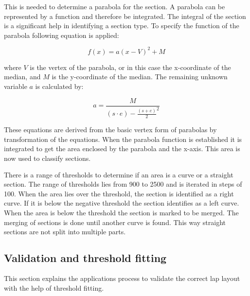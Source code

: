 This is needed to determine a parabola for the section. A parabola can be represented by a function and therefore be integrated. The integral of the section is a significant help in identifying a section type. To specify the function of the parabola following equation is applied:

\begin{equation}
	f(x) = a (x-V)^2 + M
\end{equation}

where $V$ is the vertex of the parabola, or in this case the x-coordinate of the median, and $M$ is the y-coordinate of the median. The remaining unknown variable $a$ is calculated by:

\begin{equation}
a = \frac{M}{(s\cdot e) - \frac{(s+e)}{2}^2 }
\end{equation}

These equations are derived from the basic vertex form of parabolas by transformation of the equations. When the parabola function is established it is integrated to get the area enclosed by the parabola and the x-axis. This area is now used to classify sections. 

There is a range of thresholds to determine if an area is a curve or a straight section. The range of thresholds lies from 900 to 2500 and is iterated in steps of 100. When the area lies over the threshold, the section is identified as a right curve. If it is below the negative threshold the section identifies as a left curve. When the area is below the threshold the section is marked to be merged. The merging of sections is done until another curve is found. This way straight sections are not split into multiple parts.
\subsection{Validation and threshold fitting}
This section explains the applications process to validate the correct lap layout with the help of threshold fitting.

